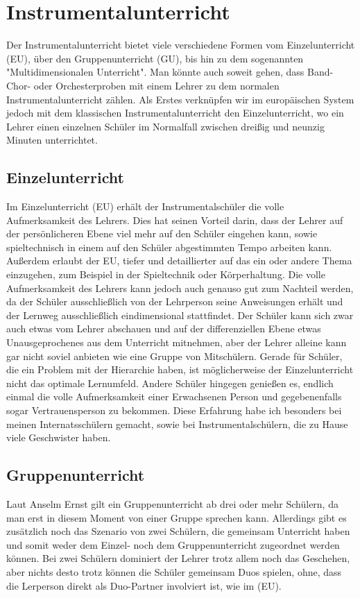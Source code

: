 \section{Instrumentalunterricht}
Der Instrumentalunterricht bietet viele verschiedene Formen vom Einzelunterricht (EU),
über den Gruppenunterricht (GU), bis hin zu dem sogenannten "Multidimensionalen
Unterricht". Man könnte auch soweit gehen, dass Band- Chor- oder Orchesterproben
mit einem Lehrer zu dem normalen Instrumentalunterricht zählen. Als Erstes
verknüpfen wir im europäischen System jedoch mit dem klassischen
Instrumentalunterricht den Einzelunterricht, wo ein Lehrer einen einzelnen
Schüler im Normalfall zwischen dreißig und neunzig Minuten unterrichtet. 


\subsection{Einzelunterricht}
Im Einzelunterricht (EU) erhält der Instrumentalschüler die volle Aufmerksamkeit des
Lehrers. Dies hat seinen Vorteil darin, dass der Lehrer auf der persönlicheren
Ebene viel mehr auf den Schüler eingehen kann, sowie spieltechnisch in einem auf
den Schüler abgestimmten Tempo arbeiten kann. Außerdem erlaubt der EU, tiefer
und detaillierter auf das ein oder andere Thema einzugehen, zum Beispiel in der
Spieltechnik oder Körperhaltung. Die volle Aufmerksamkeit des Lehrers kann jedoch auch genauso gut
zum Nachteil werden, da der Schüler ausschließlich von der Lehrperson seine
Anweisungen erhält und der Lernweg ausschließlich eindimensional stattfindet.
Der Schüler kann sich zwar auch etwas vom Lehrer abschauen und auf der
differenziellen Ebene etwas Unausgeprochenes aus dem Unterricht mitnehmen, aber
der Lehrer alleine kann gar nicht soviel anbieten wie eine Gruppe von
Mitschülern. Gerade für Schüler, die ein Problem mit der Hierarchie haben, ist
möglicherweise der Einzelunterricht nicht das optimale Lernumfeld. Andere
Schüler hingegen genießen es, endlich einmal die volle Aufmerksamkeit einer
Erwachsenen Person und gegebenenfalls sogar Vertrauensperson zu bekommen. Diese
Erfahrung habe ich besonders bei meinen Internatsschülern gemacht, sowie bei
Instrumentalschülern, die zu Hause viele Geschwister haben. 

\subsection{Gruppenunterricht} 
Laut Anselm Ernst gilt ein Gruppenunterricht ab drei oder mehr Schülern, da man
erst in diesem Moment von einer Gruppe sprechen kann.
\autocite[79]{ernst:die_zukunftsfaehige_musikschule}
Allerdings gibt es zusätzlich noch das Szenario von zwei Schülern, die gemeinsam
Unterricht haben und somit weder dem Einzel- noch dem Gruppenunterricht
zugeordnet werden können. Bei zwei Schülern dominiert der Lehrer trotz allem
noch das Geschehen, aber nichts desto trotz können die Schüler gemeinsam Duos
spielen, ohne, dass die Lerperson direkt als Duo-Partner involviert ist, wie im (EU).

